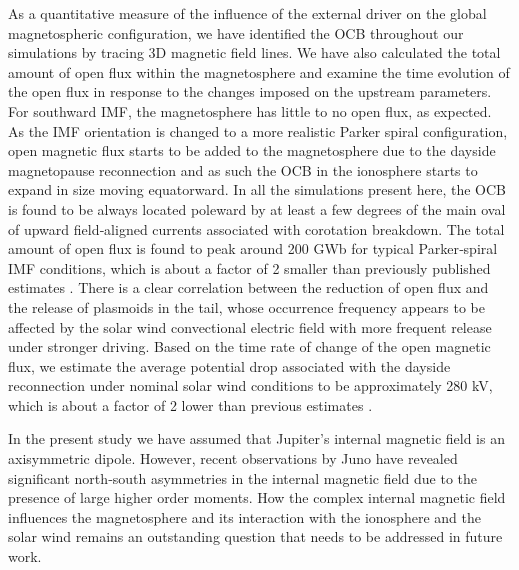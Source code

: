 As a quantitative measure of the influence of the external driver on the global magnetospheric configuration, we have identified the OCB throughout our simulations by tracing 3D magnetic field lines. We have also calculated the total amount of open flux within the magnetosphere and examine the time evolution of the open flux in response to the changes imposed on the upstream parameters. For southward IMF, the magnetosphere has little to no open flux, as expected. As the IMF orientation is changed to a more realistic Parker spiral configuration, open magnetic flux starts to be added to the magnetosphere due to the dayside magnetopause reconnection and as such the OCB in the ionosphere starts to expand in size moving equatorward. In all the simulations present here, the OCB is found to be always located poleward by at least a few degrees of the main oval of upward field‐aligned currents associated with corotation breakdown. The total amount of open flux is found to peak around 200 GWb for typical Parker‐spiral IMF conditions, which is about a factor of 2 smaller than previously published estimates \cite{Vogt2011a}. There is a clear correlation between the reduction of open flux and the release of plasmoids in the tail, whose occurrence frequency appears to be affected by the solar wind convectional electric field with more frequent release under stronger driving. Based on the time rate of change of the open magnetic flux, we estimate the average potential drop associated with the dayside reconnection under nominal solar wind conditions to be approximately 280 kV, which is about a factor of 2 lower than previous estimates \cite{Masters2017}. 

In the present study we have assumed that Jupiter's internal magnetic field is an axisymmetric dipole. However, recent observations by Juno have revealed significant north‐south asymmetries in the internal magnetic field \cite{Connerney2018} due to the presence of large higher order moments. How the complex internal magnetic field influences the magnetosphere and its interaction with the ionosphere and the solar wind remains an outstanding question that needs to be addressed in future work. 